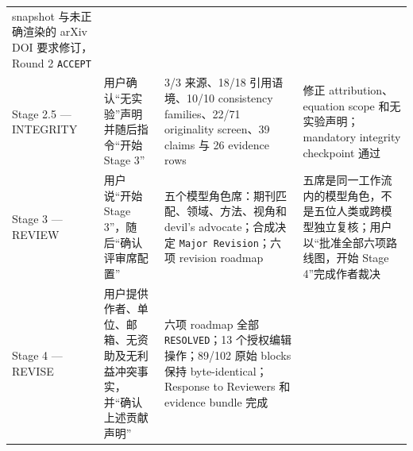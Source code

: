 \documentclass[12pt,a4paper]{article}
\begin{document}
\begin{longtable}[]{@{}llll@{}}
\begin{minipage}[t]{0.22\columnwidth}
snapshot 与未正确渲染的 arXiv DOI 要求修订，Round 2
\texttt{ACCEPT}\strut
\end{minipage}\tabularnewline
\begin{minipage}[t]{0.22\columnwidth}\raggedright
Stage 2.5 --- INTEGRITY\strut
\end{minipage} & \begin{minipage}[t]{0.22\columnwidth}\raggedright
用户确认``无实验''声明并随后指令``开始 Stage 3''\strut
\end{minipage} & \begin{minipage}[t]{0.22\columnwidth}\raggedright
3/3 来源、18/18 引用语境、10/10 consistency families、22/71 originality
screen、39 claims 与 26 evidence rows\strut
\end{minipage} & \begin{minipage}[t]{0.22\columnwidth}\raggedright
修正 attribution、equation scope 和无实验声明；mandatory integrity
checkpoint 通过\strut
\end{minipage}\tabularnewline
\begin{minipage}[t]{0.22\columnwidth}\raggedright
Stage 3 --- REVIEW\strut
\end{minipage} & \begin{minipage}[t]{0.22\columnwidth}\raggedright
用户说``开始 Stage 3''，随后``确认评审席配置''\strut
\end{minipage} & \begin{minipage}[t]{0.22\columnwidth}\raggedright
五个模型角色席：期刊匹配、领域、方法、视角和 devil's advocate；合成决定
\texttt{Major\ Revision}；六项 revision roadmap\strut
\end{minipage} & \begin{minipage}[t]{0.22\columnwidth}\raggedright
五席是同一工作流内的模型角色，不是五位人类或跨模型独立复核；用户以``批准全部六项路线图，开始
Stage 4''完成作者裁决\strut
\end{minipage}\tabularnewline
\begin{minipage}[t]{0.22\columnwidth}\raggedright
Stage 4 --- REVISE\strut
\end{minipage} & \begin{minipage}[t]{0.22\columnwidth}\raggedright
用户提供作者、单位、邮箱、无资助及无利益冲突事实，并``确认上述贡献声明''\strut
\end{minipage} & \begin{minipage}[t]{0.22\columnwidth}\raggedright
六项 roadmap 全部 \texttt{RESOLVED}；13 个授权编辑操作；89/102 原始
blocks 保持 byte-identical；Response to Reviewers 和 evidence bundle
完成\strut
\end{minipage} & \begin{minipage}[t]{0.22\columnwidth}\raggedright

\end{minipage}
\end{longtable}
\end{document}
